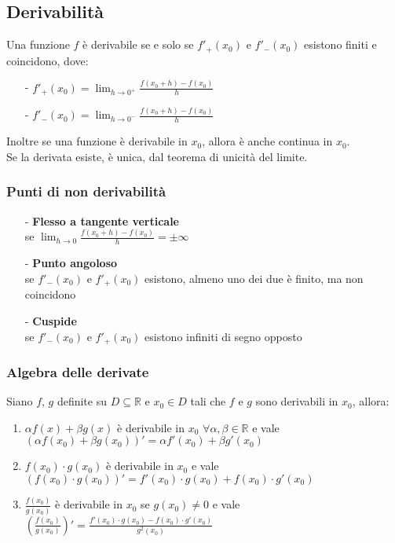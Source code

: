 \documentclass[a4paper]{article}
\begin{document}
\subsection{Derivabilità}
Una funzione \(f\) è derivabile se e solo se \(f'_+(x_0)\) e \(f'_-(x_0)\) esistono finiti e coincidono, dove:
\begin{itemize} [topsep=3pt, itemsep=0pt]
	\item[-] \(f'_+(x_0) = \displaystyle \lim_{h \to 0^+} \frac{f(x_0 + h) - f(x_0)}{h}\)
	\item[-] \(f'_-(x_0) = \displaystyle \lim_{h \to 0^-} \frac{f(x_0 + h) - f(x_0)}{h}\)
\end{itemize}
Inoltre se una funzione è derivabile in \(x_0\), allora è anche continua in \(x_0\). \\
Se la derivata esiste, è unica, dal teorema di unicità del limite. 


\subsubsection*{Punti di non derivabilità}
\begin{itemize}
	\item[-] \textbf{Flesso a tangente verticale} \\
	se \(\displaystyle \lim_{h \to 0} \frac{f(x_0 + h) - f(x_0)}{h} = \pm \infty\)
	\item[-] \textbf{Punto angoloso} \\
	se \(f'_-(x_0)\) e \(f'_+(x_0)\) esistono, almeno uno dei due è finito, ma non coincidono
	\item[-] \textbf{Cuspide} \\
	se \(f'_-(x_0)\) e \(f'_+(x_0)\) esistono infiniti di segno opposto
\end{itemize}

\newpage

\subsubsection*{Algebra delle derivate}
Siano \(f\), \(g\) definite su \(D \subseteq \mathbb{R}\) e \(x_0 \in D\) tali che \(f\) e \(g\) sono derivabili in \(x_0\), allora:
\begin{enumerate}
	\item \(\alpha f(x) + \beta g(x)\) è derivabile in \(x_0\) \(\forall \alpha, \beta \in \mathbb{R}\) e vale \(\left(\alpha f(x_0) + \beta g(x_0)\right)' = \alpha f'(x_0) + \beta g'(x_0)\)
	\item \(f(x_0) \cdot g(x_0)\) è derivabile in \(x_0\) e vale \(\left(f(x_0) \cdot g(x_0)\right)' = f'(x_0) \cdot g(x_0) + f(x_0) \cdot g'(x_0)\)
	\item \(\displaystyle \frac{f(x_0)}{g(x_0)}\) è derivabile in \(x_0\) se \(g(x_0) \neq 0\) e vale \(\displaystyle \left(\frac{f(x_0)}{g(x_0)}\right)' = \frac{f'(x_0) \cdot g(x_0) - f(x_0) \cdot g'(x_0)}{g^2(x_0)}\)
\end{enumerate}
\end{document}
